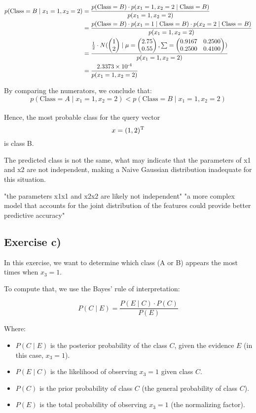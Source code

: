 \documentclass{article}
\begin{document}
\begin{align*}
    p(\text{Class} = B \mid x_1 = 1, x_2 = 2) 
    &= \frac{p(\text{Class} = B) \cdot p(x_1 = 1, x_2 = 2 \mid \text{Class} = B)}{p(x_1 = 1, x_2 = 2)} \\
    &= \frac{p(\text{Class} = B) \cdot p(x_1 = 1 \mid \text{Class} = B) \cdot p(x_2 = 2 \mid \text{Class} = B)}{p(x_1 = 1, x_2 = 2)} \\
    &= \frac{\frac{1}{2} \cdot N(
        \begin{pmatrix}1 \\ 2\end{pmatrix} \mid
        \mu = \begin{pmatrix}2.75 \\ 0.55\end{pmatrix},
        \sum = \begin{pmatrix}0.9167 & 0.2500 \\ 0.2500 & 0.4100 \end{pmatrix}
    )}{p(x_1 = 1, x_2 = 2)} \\
    &= \frac{2.3373\times10\textsuperscript{-4}}{p(x_1 = 1, x_2 = 2)}
\end{align*}

By comparing the numerators, we conclude that:
$$p(\text{Class} = A \mid x_1 = 1, x_2 = 2) < p(\text{Class} = B \mid x_1 = 1, x_2 = 2)$$
\\
Hence, the most probable class for the query vector $$x = (1, 2)\textsuperscript{T}$$ is class B.

The predicted class is not the same, what may indicate that the parameters of x1 and x2 are not independent, making a Naive Gaussian distribution inadequate for this situation.


"the parameters x1x1​ and x2x2​ are likely not independent"
"a more complex model that accounts for the joint distribution of the features could provide better predictive accuracy"
\newpage


\subsection{Exercise c)}
In this exercise, we want to determine which class (A or B) appears the most times when \( x_3 = 1 \).

To compute that, we use the Bayes' rule of interpretation:

\[
P(C \mid E) = \frac{P(E \mid C) \cdot P(C)}{P(E)}
\]

Where:
\begin{itemize}
    \item \( P(C \mid E) \) is the posterior probability of the class \( C \), given the evidence \( E \) (in this case, \( x_3 = 1 \)).
    \item \( P(E \mid C) \) is the likelihood of observing \( x_3 = 1 \) given class \( C \).
    \item \( P(C) \) is the prior probability of class \( C \) (the general probability of class \( C \)).
    \item \( P(E) \) is the total probability of observing \( x_3 = 1 \) (the normalizing factor).
\end{itemize}
\end{document}
